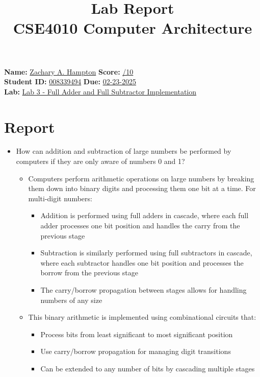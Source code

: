 \documentclass[a4paper,12pt]{article}
\title{Lab Report\\ CSE4010 Computer Architecture}
\author{}
\date{}
\begin{document}
\maketitle

\noindent \textbf{Name:} \underline{Zachary A. Hampton\hspace{5cm}} \hfill \textbf{Score:} \underline{\hspace{2cm}/10} \\
\textbf{Student ID:} \underline{008339494\hspace{6cm}} \hfill \textbf{Due:} \underline{02-23-2025} \\
\textbf{Lab:} \underline{Lab 3 - Full Adder and Full Subtractor Implementation\hspace{6cm}}

\section*{Report}
\begin{itemize}
    \item How can addition and subtraction of large numbers be performed by computers if they are only aware of numbers 0 and 1?
    \begin{itemize}
        \item Computers perform arithmetic operations on large numbers by breaking them down into binary digits and processing them one bit at a time. For multi-digit numbers:
        \begin{itemize}
            \item Addition is performed using full adders in cascade, where each full adder processes one bit position and handles the carry from the previous stage
            \item Subtraction is similarly performed using full subtractors in cascade, where each subtractor handles one bit position and processes the borrow from the previous stage
            \item The carry/borrow propagation between stages allows for handling numbers of any size
        \end{itemize}
        \item This binary arithmetic is implemented using combinational circuits that:
        \begin{itemize}
            \item Process bits from least significant to most significant position
            \item Use carry/borrow propagation for managing digit transitions
            \item Can be extended to any number of bits by cascading multiple stages
        \end{itemize}
    \end{itemize}
\end{itemize}
\end{document}
